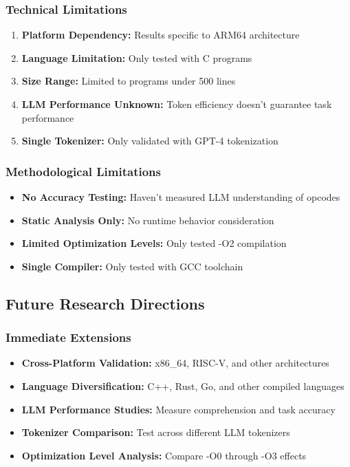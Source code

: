 \documentclass[11pt,a4paper]{article}
\begin{document}
\subsubsection{Technical Limitations}
\begin{enumerate}
    \item \textbf{Platform Dependency:} Results specific to ARM64 architecture
    \item \textbf{Language Limitation:} Only tested with C programs
    \item \textbf{Size Range:} Limited to programs under 500 lines
    \item \textbf{LLM Performance Unknown:} Token efficiency doesn't guarantee task performance
    \item \textbf{Single Tokenizer:} Only validated with GPT-4 tokenization
\end{enumerate}

\subsubsection{Methodological Limitations}
\begin{itemize}
    \item \textbf{No Accuracy Testing:} Haven't measured LLM understanding of opcodes
    \item \textbf{Static Analysis Only:} No runtime behavior consideration
    \item \textbf{Limited Optimization Levels:} Only tested -O2 compilation
    \item \textbf{Single Compiler:} Only tested with GCC toolchain
\end{itemize}

\subsection{Future Research Directions}

\subsubsection{Immediate Extensions}
\begin{itemize}
    \item \textbf{Cross-Platform Validation:} x86\_64, RISC-V, and other architectures
    \item \textbf{Language Diversification:} C++, Rust, Go, and other compiled languages
    \item \textbf{LLM Performance Studies:} Measure comprehension and task accuracy
    \item \textbf{Tokenizer Comparison:} Test across different LLM tokenizers
    \item \textbf{Optimization Level Analysis:} Compare -O0 through -O3 effects
\end{itemize}
\end{document}
